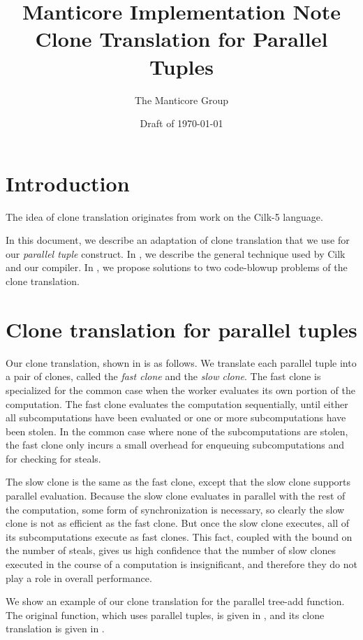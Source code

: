 \documentclass[nocopyrightspace,preprint]{../common/sigplanconf}
\title{Manticore Implementation Note \\ Clone Translation for Parallel Tuples}
\author{The Manticore Group}
\date{Draft of \today}
\begin{document}
\maketitle

\section{Introduction}
The idea of clone translation originates from work on the Cilk-5 language.

In this document, we describe an adaptation of clone translation that we use for
our \emph{parallel tuple} construct.
In , we describe the general technique used by 
Cilk and our compiler.
In , we propose solutions to two code-blowup 
problems of the clone translation.

\section{Clone translation for parallel tuples}
\label{sec:clone-translation}

Our clone translation, shown in  is as follows.  We translate each parallel
tuple into a pair of clones, called the \emph{fast clone} and the
\emph{slow clone}.  The fast clone is specialized for the common case when
the worker evaluates its own portion of the computation.  The fast
clone evaluates the computation sequentially, until either all
subcomputations have been evaluated or one or more subcomputations
have been stolen.  In the common case where none of the
subcomputations are stolen, the fast clone only incurs a small
overhead for enqueuing subcomputations and for checking for steals.

The slow clone is the same as the fast clone, except that the slow
clone supports parallel evaluation.  Because the slow clone evaluates
in parallel with the rest of the computation, some form of synchronization
is necessary, so clearly the slow clone is not as efficient as the fast 
clone.  But once the slow clone executes, all of its subcomputations execute 
as fast clones. This fact, coupled with the bound on the number of steals, 
gives us high confidence that the number of slow clones executed in the course of
a computation is insignificant, and therefore they do not play a
role in overall performance.

We show an example of our clone translation for the parallel tree-add function.
The original function, which uses parallel tuples, is given in ,
and its clone translation is given in .
\end{document}
